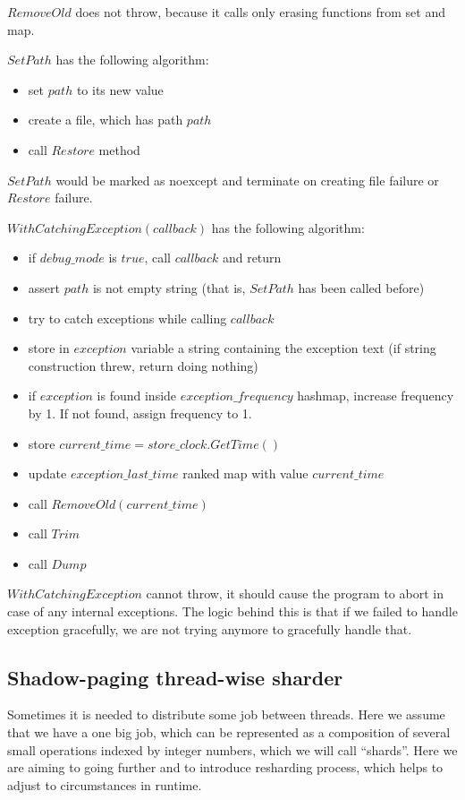 \documentclass{article}
\begin{document}
$RemoveOld$ does not throw, because it calls only erasing functions from set and map.

$SetPath$ has the following algorithm:
\begin{itemize}
	\item set $path$ to its new value
	\item create a file, which has path $path$
	\item call $Restore$ method
\end{itemize}

$SetPath$ would be marked as noexcept and terminate on creating file failure or $Restore$ failure.

$WithCatchingException(callback)$ has the following algorithm:
\begin{itemize}
	\item if $debug\_mode$ is $true$, call $callback$ and return
	\item assert $path$ is not empty string (that is, $SetPath$ has been called before)
	\item try to catch exceptions while calling $callback$
	\item store in $exception$ variable a string containing the exception text (if string construction threw, return doing nothing)
	\item if $exception$ is found inside $exception\_frequency$ hashmap, increase frequency by 1. If not found, assign frequency to 1.
	\item store $current\_time = store\_clock.GetTime()$
	\item update $exception\_last\_time$ ranked map with value $current\_time$
	\item call $RemoveOld(current\_time)$
	\item call $Trim$
	\item call $Dump$
\end{itemize}

$WithCatchingException$ cannot throw, it should cause the program to abort in case of any internal exceptions. The logic behind this is that if we failed to handle exception gracefully, we are not trying anymore to gracefully handle that.

\subsection{Shadow-paging thread-wise sharder}
\label{subsec:shadow_page_thread_wise_sharder}

Sometimes it is needed to distribute some job between threads. Here we assume that we have a one big job, which can be represented as a composition of several small operations indexed by integer numbers, which we will call ``shards''. Here we are aiming to going further and to introduce resharding process, which helps to adjust to circumstances in runtime.
\end{document}
